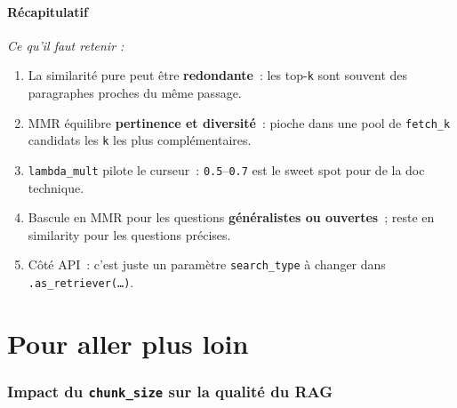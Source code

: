 \documentclass[11pt,a4paper]{article}
\begin{document}
\subsection*{Récapitulatif}
{\itshape\sloppy
\textit{Ce qu'il faut retenir :}
\begin{enumerate}[leftmargin=*]
  \item La similarité pure peut être \textbf{redondante}~: les top-\texttt{k}
        sont souvent des paragraphes proches du même passage.
  \item MMR équilibre \textbf{pertinence et diversité}~: pioche dans une
        pool de \texttt{fetch\_k} candidats les \texttt{k} les plus
        complémentaires.
  \item \texttt{lambda\_mult} pilote le curseur~: \texttt{0.5}--\texttt{0.7}
        est le sweet spot pour de la doc technique.
  \item Bascule en MMR pour les questions \textbf{généralistes ou
        ouvertes}~; reste en similarity pour les questions précises.
  \item Côté API~: c'est juste un paramètre \texttt{search\_type} à
        changer dans \texttt{.as\_retriever(\dots)}.
\end{enumerate}
\par}

\part{Pour aller plus loin}

\section{Impact du \texttt{chunk\_size} sur la qualité du RAG}
\end{document}
